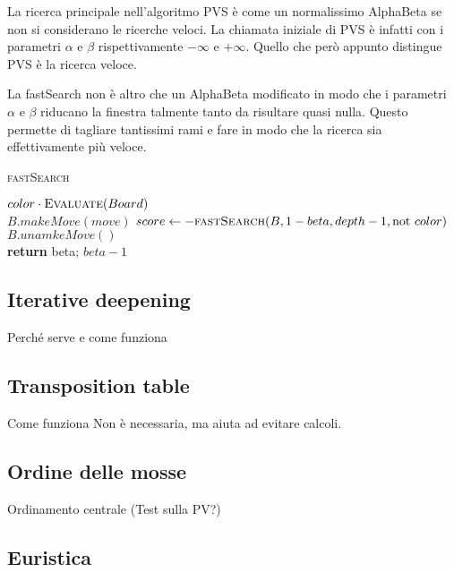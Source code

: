 \documentclass[a4paper]{article}
\begin{document}
La ricerca principale nell'algoritmo PVS è come un normalissimo AlphaBeta se non
si considerano le ricerche veloci. La chiamata iniziale di PVS è infatti con i
parametri $\alpha$ e $\beta$ rispettivamente $-\infty$ e $+\infty$. Quello che 
però appunto distingue PVS è la ricerca veloce.

La fastSearch non è altro che un AlphaBeta modificato in modo che i parametri 
$\alpha$ e $\beta$ riducano la finestra talmente tanto da risultare quasi nulla.
Questo permette di tagliare tantissimi rami e fare in modo che la ricerca sia
effettivamente più veloce.

\begin{algorithm}
  \caption{\textsc{fastSearch}}
  \label{alg:fastSeach}
  \begin{algorithmic}

        \State \Return $color \cdot \Call{Evaluate}{Board}$
      \EndIf
      \\
        \State $B.makeMove(move)$
        \State $score \gets -\Call{fastSearch}{B, 1 - beta, depth - 1, \textrm{not } color}$
        \State $B.unamkeMove()$
        \\
        \State \textbf{return} beta;
        \EndIf
      \EndFor
      \State \Return $beta - 1$
    \EndFunction
  \end{algorithmic}
\end{algorithm}

\subsection{Iterative deepening}
Perché serve e come funziona

\subsection{Transposition table}
Come funziona
Non è necessaria, ma aiuta ad evitare calcoli.

\subsection{Ordine delle mosse}
Ordinamento centrale
(Test sulla PV?)

\subsection{Euristica}
\end{document}
